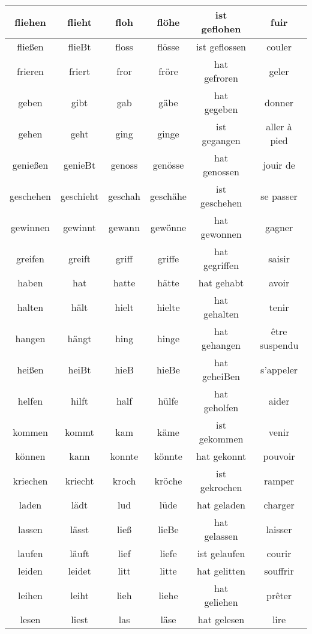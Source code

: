 \documentclass{article}
\begin{document}
\begin{center}
\begin{longtable}{|c|c|c|c|c|c|}
\\
	\hline
	fliehen &  flieht &  floh &  flöhe &  ist geflohen & fuir
\\
	\hline
	fließen &  flieBt &  floss &  flösse &  ist geflossen & couler
\\
	\hline
	frieren &  friert &  fror &  fröre &  hat gefroren & geler
\\
	\hline
	geben &  gibt &  gab &  gäbe &  hat gegeben & donner
\\
	\hline
	gehen &  geht &  ging &  ginge &  ist gegangen & aller à pied
\\
	\hline
	genießen &  genieBt &  genoss &  genösse &  hat genossen & jouir de
\\
	\hline
	geschehen &  geschieht &  geschah &  geschähe &  ist geschehen & se passer
\\
	\hline
	gewinnen &  gewinnt &  gewann &  gewönne &  hat gewonnen & gagner
\\
	\hline
	greifen &  greift &  griff &  griffe &  hat gegriffen & saisir
\\
	\hline
	haben &  hat &  hatte &  hätte &  hat gehabt & avoir
\\
	\hline
	halten &  hält &  hielt &  hielte &  hat gehalten & tenir
\\
	\hline
	hangen &  hängt &  hing &  hinge &  hat gehangen & être suspendu
\\
	\hline
	heißen &  heiBt &  hieB &  hieBe &  hat geheiBen & s'appeler
\\
	\hline
	helfen &  hilft &  half &  hülfe &  hat geholfen & aider
\\
	\hline
	kommen &  kommt &  kam &  käme &  ist gekommen & venir
\\
	\hline
	können &  kann &  konnte &  könnte &  hat gekonnt & pouvoir
\\
	\hline
	kriechen &  kriecht &  kroch &  kröche &  ist gekrochen & ramper
\\
	\hline
	laden &  lädt &  lud &  lüde &  hat geladen & charger
\\
	\hline
	lassen &  lässt &  ließ &  lieBe &  hat gelassen & laisser
\\
	\hline
	laufen &  läuft &  lief &  liefe &  ist gelaufen & courir
\\
	\hline
	leiden &  leidet &  litt &  litte &  hat gelitten & souffrir
\\
	\hline
	leihen &  leiht &  lieh &  liehe &  hat geliehen & prêter
\\
	\hline
	lesen &  liest &  las &  läse &  hat gelesen & lire
\\

\end{longtable}
\end{center}
\end{document}
